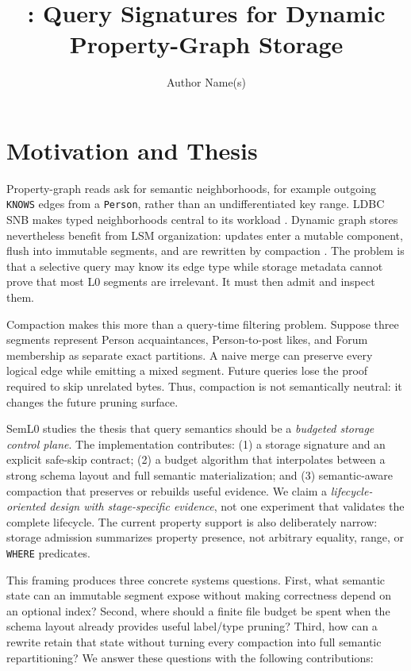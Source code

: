 \documentclass[sigconf,screen]{cidr-2027}
\title{\sys: Query Signatures for Dynamic Property-Graph Storage}
\author{Author Name(s)}
\affiliation{%
  \institution{Institution}
  \country{Country}
}
\newcommand{\sys}{SemL0\xspace}
\begin{document}
\maketitle

\section{Motivation and Thesis}

Property-graph reads ask for semantic neighborhoods, for example outgoing
\texttt{KNOWS} edges from a \texttt{Person}, rather than an undifferentiated
key range. LDBC SNB makes typed neighborhoods central to its workload
\cite{ldbc}. Dynamic graph stores nevertheless benefit from LSM organization:
updates enter a mutable component, flush into immutable segments, and are
rewritten by compaction \cite{lsm,lsmgraph}. The problem is that a selective
query may know its edge type while storage metadata cannot prove that most L0
segments are irrelevant. It must then admit and inspect them.

Compaction makes this more than a query-time filtering problem. Suppose three
segments represent Person acquaintances, Person-to-post likes, and Forum
membership as separate exact partitions. A naive merge can preserve every
logical edge while emitting a mixed segment. Future queries lose the proof
required to skip unrelated bytes. Thus, compaction is not semantically neutral:
it changes the future pruning surface.

\sys studies the thesis that query semantics should be a \emph{budgeted
storage control plane}. The implementation contributes: (1) a storage
signature and an explicit safe-skip contract; (2) a budget algorithm that
interpolates between a strong schema layout and full semantic materialization;
and (3) semantic-aware compaction that preserves or rebuilds useful evidence.
We claim a \emph{lifecycle-oriented design with stage-specific evidence}, not
one experiment that validates the complete lifecycle. The current property
support is also deliberately narrow: storage admission summarizes property
presence, not arbitrary equality, range, or \texttt{WHERE} predicates.

This framing produces three concrete systems questions. First, what semantic
state can an immutable segment expose without making correctness depend on an
optional index? Second, where should a finite file budget be spent when the
schema layout already provides useful label/type pruning? Third, how can a
rewrite retain that state without turning every compaction into full semantic
repartitioning? We answer these questions with the following contributions:
\end{document}
